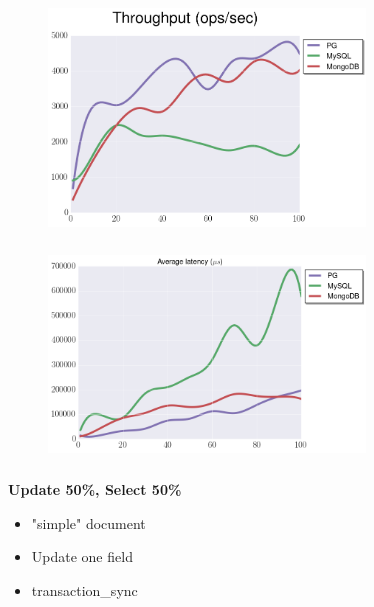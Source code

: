 \documentclass[usenames,dvipsnames, 18pt, compress, aspectratio=169]{beamer}
\begin{document}
\begin{frame}
    \frametitle{}
    \begin{center}
    \begin{figure}
        \includegraphics[width=0.75\textwidth,center]{benchmarks/insert_throughput_journaled.png}
    \end{figure}
    \end{center}
\end{frame}

\begin{frame}
    \frametitle{}
    \begin{center}
    \begin{figure}
        \includegraphics[width=0.75\textwidth,center]{benchmarks/insert_latency_99.png}
    \end{figure}
    \end{center}
\end{frame}

\begin{frame}
    \frametitle{}
    \begin{center}
        \textbf{Update 50\%, Select 50\%}
        \begin{itemize}[label={}]
            \item "simple" document
            \item Update one field
            \item transaction\_sync
        \end{itemize}
    \end{center}
\end{frame}
\end{document}
